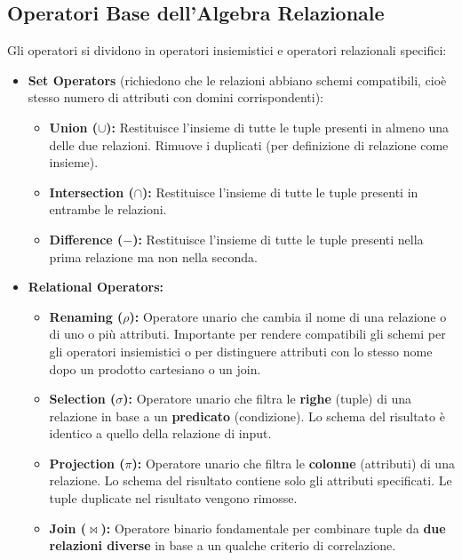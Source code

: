 \documentclass{article}
\newcommand{\union}{\cup}
\newcommand{\intersection}{\cap}
\newcommand{\naturaljoin}{\Join}
\begin{document}
	\subsection{Operatori Base dell'Algebra Relazionale}
	
	Gli operatori si dividono in operatori insiemistici e operatori relazionali specifici:
	
	\begin{itemize}
		\item \textbf{Set Operators} (richiedono che le relazioni abbiano schemi compatibili, cioè stesso numero di attributi con domini corrispondenti):
		\begin{itemize}
			\item \textbf{Union ($\union$):} Restituisce l'insieme di tutte le tuple presenti in almeno una delle due relazioni. Rimuove i duplicati (per definizione di relazione come insieme).
			\item \textbf{Intersection ($\intersection$):} Restituisce l'insieme di tutte le tuple presenti in entrambe le relazioni.
			\item \textbf{Difference ($-$):} Restituisce l'insieme di tutte le tuple presenti nella prima relazione ma non nella seconda.
		\end{itemize}
		\item \textbf{Relational Operators:}
		\begin{itemize}
			\item \textbf{Renaming ($\rho$):} Operatore unario che cambia il nome di una relazione o di uno o più attributi. Importante per rendere compatibili gli schemi per gli operatori insiemistici o per distinguere attributi con lo stesso nome dopo un prodotto cartesiano o un join.
			\item \textbf{Selection ($\sigma$):} Operatore unario che filtra le \textbf{righe} (tuple) di una relazione in base a un \textbf{predicato} (condizione). Lo schema del risultato è identico a quello della relazione di input.
			\item \textbf{Projection ($\pi$):} Operatore unario che filtra le \textbf{colonne} (attributi) di una relazione. Lo schema del risultato contiene solo gli attributi specificati. Le tuple duplicate nel risultato vengono rimosse.
			\item \textbf{Join ($\naturaljoin$):} Operatore binario fondamentale per combinare tuple da \textbf{due relazioni diverse} in base a un qualche criterio di correlazione.
		\end{itemize}
	\end{itemize}
	
\end{document}
